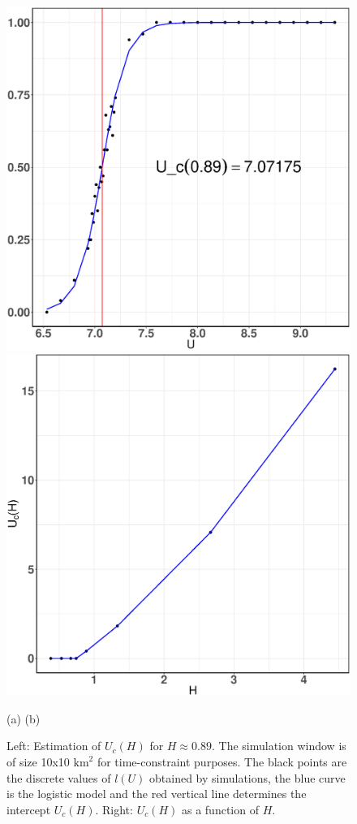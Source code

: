 \documentclass[conference]{IEEEtran}
\begin{document}
\begin{figure}[t!]
\centerline{
\includegraphics[width=0.48\linewidth]{Figures/Uc-example}
\hspace{0.01\linewidth}
\includegraphics[width=0.48\linewidth]{Figures/Uc-general-curve}}
\centerline{\footnotesize\hspace{0.25\linewidth} (a)\hspace{0.5\linewidth} (b) \hspace{0.25\linewidth}\ }
\caption{Left: Estimation of $U_{c}(H)$ for $H\approx 0.89$. The simulation window is of size 10x10 $\text{km}^{2}$ for time-constraint purposes. The black points are the discrete values of $l(U)$ obtained by simulations, the blue curve is the logistic model and the red vertical line determines the intercept $U_{c}(H)$. Right: $U_c(H)$ as a function of $H$.}
\label{critical-user-estimation}
\end{figure}
\end{document}
